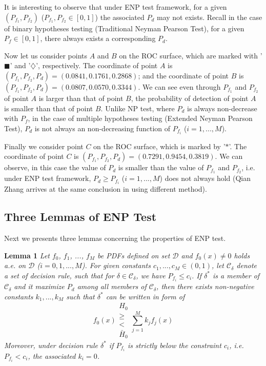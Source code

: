It is interesting to observe that under ENP test framework, for a given $(P_{f_1}, P_{f_2})$  ($P_{f_1}, P_{f_2}\in [0, 1]$) the associated $P_d$ may not exists. 
Recall in the case of binary hypotheses testing (Traditional Neyman Pearson Test), for a given $P_f \in [0, 1]$, there always exists a corresponding $P_d$. 

Now let us consider points $A$ and $B$ on the ROC surface, which are marked with '$\blacksquare$' and '$\diamondsuit$', respectively.  The coordinate of point $A$ is $(P_{f_1}, P_{f_2}, P_d) = (0.0841, 0.1761, 0.2868)$; and the coordinate of point $B$ is  $(P_{f_1}, P_{f_2}, P_d) = (0.0807, 0.0570, 0.3344)$. We can see even through $P_{f_1}$ and $P_{f_2}$ of point $A$ is larger than that of point $B$, the probability of detection of point $A$ is  smaller than that of point $B$.  
Unlike NP test, where $P_d$ is always non-decrease with $P_f$, in the case of multiple hypotheses testing (Extended Neyman Pearson Test), $P_d$ is not always an non-decreasing function of  $P_{f_i}$ ($i=1, ..., M$).

Finally we consider point $C$ on the ROC surface, which is marked by '$\ast$'. The coordinate of point $C$ is $(P_{f_1}, P_{f_2}, P_d) = (0.7291, 0.9454, 0.3819)$. We can observe, in this case the value of $P_d$ is smaller than the value of $P_{f_1}$ and $P_{f_2}$, i.e. under ENP test framework, $P_d \geq P_{f_i}$  ($i = 1, ..., M$) does not always hold (Qian Zhang arrives at the same conclusion in  \cite{zhang1999design, zhang2000efficient} using different method). 

\subsection{Three Lemmas of ENP Test}

Next we presents three lemmas concerning the properties of ENP test.

\noindent \textbf{Lemma 1}
\noindent \textit{
Let $f_0$, $f_1$, ..., $f_M$ be PDFs defined on set $\mathcal{D}$ and $f_0(x) \neq 0$ holds a.e. on $\mathcal{D}$ ($i=0, 1,..., M$). For given constants $c_1, ..., c_M \in (0, 1)$, let $\mathcal{C}_\delta$ denote a set of decision rule,  such that for $\delta \in \mathcal{C}_\delta$, we have $P_{f_i} \leq c_i$.
If  $\delta^{\ast}$ is a member of $\mathcal{C}_\delta$ and it maximize $P_d$ among all members of $\mathcal{C}_\delta$, then there exists non-negative constants $k_1, ..., k_M$ such that $\delta^\ast$ can be written in form of  
\begin{equation}
f_0(x) \substack{H_0 \\ \geq \\ < \\ \bar{H}_0} \sum_{j=1}^{M}k_jf_j(x)
\end{equation}
Moreover, under decision rule $\delta^\ast$ if $P_{f_i} $ is strictly  below the constraint $c_i$, i.e. $P_{f_i} < c_i$, the associated $k_i = 0$. 
}

